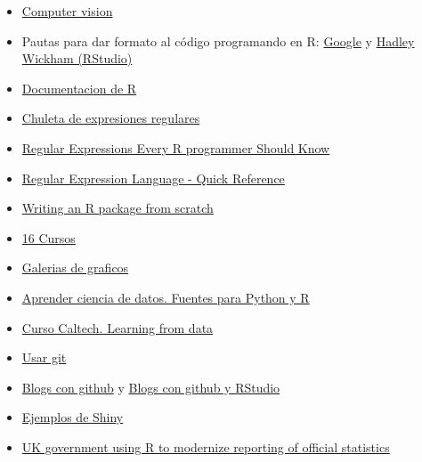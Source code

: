 \documentclass[]{article}
\begin{document}
\begin{itemize}
\item
  \href{https://github.com/kjw0612/awesome-deep-vision}{Computer vision}
\item
  Pautas para dar formato al código programando en R:
  \href{https://google.github.io/styleguide/Rguide.xml}{Google} y
  \href{http://adv-r.had.co.nz/Style.html}{Hadley Wickham (RStudio)}
\item
  \href{https://www.rdocumentation.org/}{Documentacion de R}
\item
  \href{https://www.rstudio.com/wp-content/uploads/2016/09/RegExCheatsheet.pdf}{Chuleta
  de expresiones regulares}
\item
  \href{https://www.r-bloggers.com/regular-expressions-every-r-programmer-should-know/}{Regular
  Expressions Every R programmer Should Know}
\item
  \href{https://docs.microsoft.com/en-us/dotnet/standard/base-types/regular-expression-language-quick-reference}{Regular
  Expression Language - Quick Reference}
\item
  \href{https://hilaryparker.com/2014/04/29/writing-an-r-package-from-scratch/}{Writing
  an R package from scratch}
\item
  \href{https://www.analyticsvidhya.com/blog/2016/10/16-new-must-watch-tutorials-courses-on-machine-learning/?utm_source=feedburner\&utm_medium=email\&utm_campaign=Feed\%3A+AnalyticsVidhya+\%28Analytics+Vidhya\%29}{16
  Cursos}
\item
  \href{http://www.r-graph-gallery.com/}{Galerias de graficos}
\item
  \href{https://www.datacamp.com/community/tutorials/learn-data-science-resources-for-python-r}{Aprender
  ciencia de datos. Fuentes para Python y R}
\item
  \href{https://work.caltech.edu/telecourse.html}{Curso Caltech.
  Learning from data}
\item
  \href{https://try.github.io/levels/1/challenges/1}{Usar git}
\item
  \href{http://jmcglone.com/guides/github-pages/}{Blogs con github} y
  \href{http://andysouth.github.io/blog-setup/}{Blogs con github y
  RStudio}
\item
  \href{http://zevross.com/blog/2016/04/19/r-powered-web-applications-with-shiny-a-tutorial-and-cheat-sheet-with-40-example-apps/}{Ejemplos
  de Shiny}
\item
  \href{https://www.r-bloggers.com/uk-government-using-r-to-modernize-reporting-of-official-statistics/}{UK
  government using R to modernize reporting of official statistics}

\end{itemize}
\end{document}
